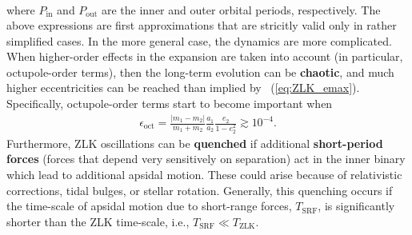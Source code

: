 \documentclass[main.tex]{subfiles}
\begin{document}
\begin{tcolorbox}[sharp corners, colback=blue!30, colframe=blue!80!blue, title=Box \refstepcounter{educhap3}\label{boxchap3:dynV}\ref{boxchap3:dynV} -- Orbital dynamics V]
{\begin{align}
\end{align}
where $P_\mathrm{in}$ and $P_\mathrm{out}$ are the inner and outer orbital periods, respectively. 
The above expressions are first approximations that are stricitly valid only in rather simplified cases. In the more general case, the dynamics are more complicated. When higher-order effects in the expansion are taken into account (in particular, octupole-order terms), then the long-term evolution can be {\bf chaotic}, and much higher eccentricities can be reached than implied by \Eq~(\ref{eq:ZLK_emax}). Specifically, octupole-order terms start to become important when
\begin{align}
\epsilon_\mathrm{oct} = \frac{|m_1-m_2|}{m_1+m_2} \frac{a_1}{a_2} \frac{e_2}{1-e_2^2} \gtrsim 10^{-4}.
\end{align}
Furthermore, ZLK oscillations can be {\bf quenched} if additional {\bf short-period forces} (forces that depend very sensitively on separation) act in the inner binary which lead to additional apsidal motion. These could arise because of relativistic corrections, tidal bulges, or stellar rotation. Generally, this quenching occurs if the time-scale of apsidal motion due to short-range forces, $T_\mathrm{SRF}$, is significantly shorter than the ZLK time-scale, i.e., $T_\mathrm{SRF} \ll T_\mathrm{ZLK}$. 
}  
\end{tcolorbox}
\end{document}
